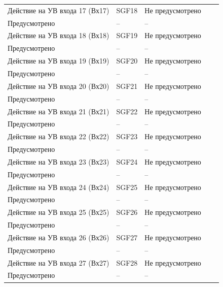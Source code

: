 \begin{longtable}{|>{\centering\arraybackslash}m{5.3cm}|>{\centering\arraybackslash}m{3.3cm}|>{\centering\arraybackslash}m{4.2cm}|>{\centering\arraybackslash}m{1.8cm}|>{\centering\arraybackslash}m{1cm}|}
\hline
\centering Действие на УВ входа 17 (Вх17)  & \centering SGF18 & \centering Не предусмотрено \\ Предусмотрено & \centering -- & \centering \arraybackslash -- \\
\hline
\centering Действие на УВ входа 18 (Вх18)  & \centering SGF19 & \centering Не предусмотрено \\ Предусмотрено & \centering -- & \centering \arraybackslash -- \\
\hline
\centering Действие на УВ входа 19 (Вх19)  & \centering SGF20 & \centering Не предусмотрено \\ Предусмотрено & \centering -- & \centering \arraybackslash -- \\
\hline
\centering Действие на УВ входа 20 (Вх20)  & \centering SGF21 & \centering Не предусмотрено \\ Предусмотрено & \centering -- & \centering \arraybackslash -- \\
\hline
\centering Действие на УВ входа 21 (Вх21)  & \centering SGF22 & \centering Не предусмотрено \\ Предусмотрено & \centering -- & \centering \arraybackslash -- \\
\hline
\centering Действие на УВ входа 22 (Вх22)  & \centering SGF23 & \centering Не предусмотрено \\ Предусмотрено & \centering -- & \centering \arraybackslash -- \\
\hline
\centering Действие на УВ входа 23 (Вх23)  & \centering SGF24 & \centering Не предусмотрено \\ Предусмотрено & \centering -- & \centering \arraybackslash -- \\
\hline
\centering Действие на УВ входа 24 (Вх24)  & \centering SGF25 & \centering Не предусмотрено \\ Предусмотрено & \centering -- & \centering \arraybackslash -- \\
\hline
\centering Действие на УВ входа 25 (Вх25)  & \centering SGF26 & \centering Не предусмотрено \\ Предусмотрено & \centering -- & \centering \arraybackslash -- \\
\hline
\centering Действие на УВ входа 26 (Вх26)  & \centering SGF27 & \centering Не предусмотрено \\ Предусмотрено & \centering -- & \centering \arraybackslash -- \\
\hline
\centering Действие на УВ входа 27 (Вх27)  & \centering SGF28 & \centering Не предусмотрено \\ Предусмотрено & \centering -- & \centering \arraybackslash -- \\

\end{longtable}

